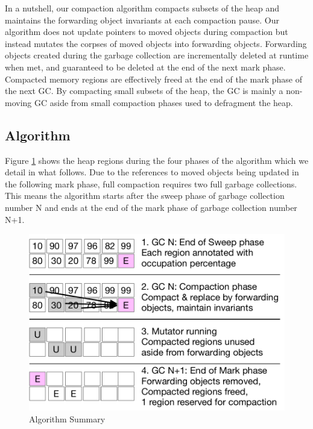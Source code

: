 \documentclass[sigplan,10pt,review,anonymous]{acmart}\settopmatter{printfolios=true,printccs=false,printacmref=false}
\begin{document}
In a nutshell, our compaction algorithm compacts subsets of the heap and maintains the forwarding object invariants at each compaction pause. 
Our algorithm does not update pointers to moved objects during compaction but instead mutates the corpses of moved objects into forwarding objects. Forwarding objects created during the garbage collection are incrementally deleted at runtime when met, and guaranteed to be deleted at the end of the next mark phase. Compacted memory regions are effectively freed at the end of the mark phase of the next GC. By compacting small subsets of the heap, the GC is mainly a non-moving GC aside from small compaction phases used to defragment the heap.

\subsection{Algorithm}

Figure \ref{fig:Algo} shows the heap regions during the four phases of the algorithm which we detail in what follows. Due to the references to moved objects being updated in the following mark phase, full compaction requires two full garbage collections. 
This means the algorithm starts after the sweep phase of garbage collection number N and ends at the end of the mark phase of garbage collection number N+1.

\begin{figure}[bth]
		\vspace{-0.1cm}
		\includegraphics[width=.90\linewidth]{figures/SelectiveCompactFig} 
		\vspace{-0.3cm}
		\caption{Algorithm Summary\vspace{-0.3cm}}
		\label{fig:Algo}
 \end{figure}
\end{document}
